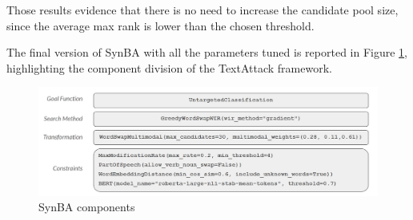 Those results evidence that there is no need to increase the candidate pool size, since the average max rank is lower than the chosen threshold.

The final version of SynBA with all the parameters tuned is reported in Figure \ref{fig:3_synba_components},
highlighting the component division of the TextAttack framework.

\begin{figure}[h]
    \centering
    \includegraphics[width=0.9\linewidth]{images/3_synba_components.png}
    \caption{SynBA components}
    \label{fig:3_synba_components}
\end{figure}

